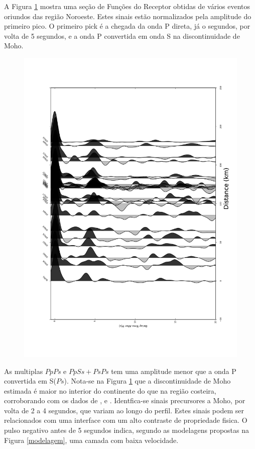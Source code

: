 A Figura \ref{RF_perfil_NW} mostra uma seção de Funções do Receptor obtidas de vários eventos oriundos das região Noroeste. Estes sinais estão normalizados pela amplitude do primeiro pico. O primeiro pick é a chegada da onda P direta, já o segundos, por volta de 5 segundos, e a onda P convertida em onda S na discontinuidade de Moho.

\begin{figure}[!ht]
\centering
\includegraphics[scale=0.15]{Perfil_RF_NWLS.png}
\caption{}
\label{RF_perfil_NW}
\end{figure}


As multiplas $PpPs$ e $PpSs+PsPs$ tem uma amplitude menor que a onda P convertida em S($Ps$). Nota-se na Figura \ref{RF_perfil_NW} que a discontinuidade de Moho estimada é maior no interior do continente do que na região costeira, corroborando com os dados de \cite{Assumpcao_America_2013}, \citep{Assumpcao_Brazil_2013} e \cite{van_der_meijde_gravity_2013} . Identfica-se sinais precursores a Moho, por volta de 2 a 4 segundos, que variam ao longo do perfil. Estes sinais podem ser relacionados com uma interface com um alto contraste de propriedade fisica. O pulso negativo antes de 5 segundos indica, segundo as modelagens propostas na Figura \ref{modelagem}, uma camada com baixa velocidade.






